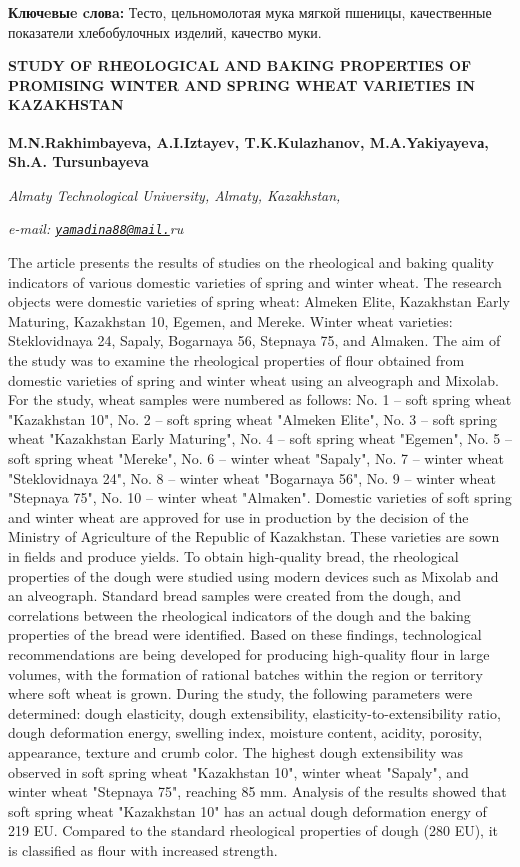{\bfseries Ключeвыe cловa:} Тесто, цельномолотая мука мягкой пшеницы,
качественные показатели хлебобулочных изделий, качество муки.

\begin{articleheader}
{\bfseries STUDY OF RHEOLOGICAL AND BAKING PROPERTIES OF PROMISING WINTER AND SPRING WHEAT VARIETIES IN KAZAKHSTAN}

{\bfseries
M.N.Rakhimbayeva,
A.I.Iztayev,
T.K.Kulazhanov,
M.A.Yakiyayevа\textsuperscript{\envelope },
Sh.A. Tursunbayeva}
\end{articleheader}

\begin{affiliation}
\emph{Almaty Technological University, Almaty, Kazakhstan,}

\emph{e-mail: \href{mailto:yamadina88@mail.}{\nolinkurl{yamadina88@mail.}}ru}
\end{affiliation}

The article presents the results of studies on the rheological and
baking quality indicators of various domestic varieties of spring and
winter wheat. The research objects were domestic varieties of spring
wheat: Almeken Elite, Kazakhstan Early Maturing, Kazakhstan 10, Egemen,
and Mereke. Winter wheat varieties: Steklovidnaya 24, Sapaly, Bogarnaya
56, Stepnaya 75, and Almaken. The aim of the study was to examine the
rheological properties of flour obtained from domestic varieties of
spring and winter wheat using an alveograph and Mixolab. For the study,
wheat samples were numbered as follows: No. 1 -- soft spring wheat
"Kazakhstan 10", No. 2 -- soft spring wheat "Almeken Elite", No. 3 --
soft spring wheat "Kazakhstan Early Maturing", No. 4 -- soft spring
wheat "Egemen", No. 5 -- soft spring wheat "Mereke", No. 6 -- winter
wheat "Sapaly", No. 7 -- winter wheat "Steklovidnaya 24", No. 8 --
winter wheat "Bogarnaya 56", No. 9 -- winter wheat "Stepnaya 75", No. 10
-- winter wheat "Almaken". Domestic varieties of soft spring and winter
wheat are approved for use in production by the decision of the Ministry
of Agriculture of the Republic of Kazakhstan. These varieties are sown
in fields and produce yields. To obtain high-quality bread, the
rheological properties of the dough were studied using modern devices
such as Mixolab and an alveograph. Standard bread samples were created
from the dough, and correlations between the rheological indicators of
the dough and the baking properties of the bread were identified. Based
on these findings, technological recommendations are being developed for
producing high-quality flour in large volumes, with the formation of
rational batches within the region or territory where soft wheat is
grown. During the study, the following parameters were determined: dough
elasticity, dough extensibility, elasticity-to-extensibility ratio,
dough deformation energy, swelling index, moisture content, acidity,
porosity, appearance, texture and crumb color. The highest dough
extensibility was observed in soft spring wheat "Kazakhstan 10", winter
wheat "Sapaly", and winter wheat "Stepnaya 75", reaching 85 mm. Analysis
of the results showed that soft spring wheat "Kazakhstan 10" has an
actual dough deformation energy of 219 EU. Compared to the standard
rheological properties of dough (280 EU), it is classified as flour with
increased strength.

